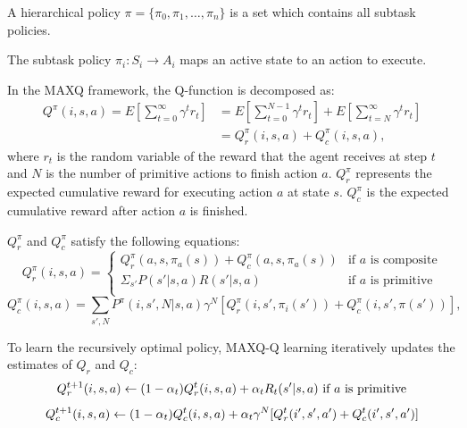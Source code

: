 \begin{definition}
A hierarchical policy $\pi = \{\pi_0, \pi_1, \dots, \pi_n\}$ is a set which contains all subtask policies. 
\end{definition}
The subtask policy $\pi_i: S_i \rightarrow A_i$ maps an active state to an action to execute.


In the MAXQ framework, the Q-function is decomposed as:
\begin{align}
    Q^{\pi}(i, s, a) = E[\sum_{t=0}^{\infty}\gamma^t r_t] &= E[\sum_{t=0}^{N - 1}\gamma^t r_t] + E[\sum_{t=N}^{\infty}\gamma^t r_t]\\
                    &= Q_r^{\pi}(i, s, a) + Q_c^{\pi}(i, s, a),
\end{align}
where $r_t$ is the random variable of the reward that the agent receives at step $t$ and $N$ is the number of primitive actions to finish action $a$.
$ Q_r^{\pi}$ represents the expected cumulative reward for executing action $a$ at state $s$.
$Q_c^{\pi}$ is the expected cumulative reward after action $a$ is finished.


$Q_r^{\pi}$ and $Q_c^{\pi}$ satisfy the following equations:
\begin{equation}
    Q_r^{\pi}(i, s, a) = 
    \left\{\begin{array}{ll}
        Q_r^{\pi}(a, s, \pi_a(s)) + Q_c^{\pi}(a, s, \pi_a(s))& \mbox{if $a$ is composite} \\
        \Sigma_{s'} P(s'|s, a)R(s'|s, a) & \mbox{if $a$ is primitive} \\  
    \end{array} \right.
\end{equation}
\begin{equation}
    Q_c^{\pi}(i, s, a) = \sum_{s', N} P^{\pi}(i, s', N|s, a)\gamma^N[Q_r^{\pi}(i, s', \pi_i(s')) + Q_c^{\pi}(i, s', \pi(s'))],
\end{equation}

To learn the recursively optimal policy, MAXQ-Q learning iteratively updates
the estimates of $Q_r$ and $Q_c$:
\begin{equation}
    Q_r^{t+1}(i, s, a) \leftarrow
    (1 - \alpha_t)Q_r^t(i, s, a) + \alpha_t R_t(s'| s, a)   \mbox{ if $a$ is primitive} \\
\end{equation}
\begin{equation}
    Q_c^{t+1}(i, s, a) \leftarrow
    (1 - \alpha_t)Q_c^t(i, s, a) + \alpha_t \gamma^N[Q_r^{t}(i', s', a') + Q_c^t(i', s', a')] \\
\end{equation}


